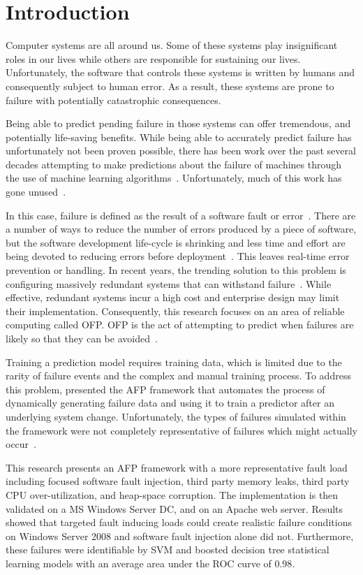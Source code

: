\section{Introduction} \label{chapter1}
Computer systems are all around us.  Some of these systems play insignificant
roles in our lives while others are responsible for sustaining our lives.
Unfortunately, the software that controls these systems is written by humans
and consequently subject to human error.  As a result, these systems are prone
to failure with potentially catastrophic consequences.  

Being able to predict pending failure in those systems can offer tremendous,
and potentially life-saving benefits.  While being able to accurately predict
failure has unfortunately not been proven possible, there has been work over
the past several decades attempting to make predictions about the failure of
machines through the use of machine learning algorithms~\citep{salfnerSurvey}.
Unfortunately, much of this work has gone unused~\citep{irrera2015}.  

In this case, failure is defined as the result of a software fault or
error~\citep{salfnerSurvey}.  There are a number of ways to reduce the number
of errors produced by a piece of software, but the software development
life-cycle is shrinking and less time and effort are being devoted to reducing
errors before deployment~\citep{schmidt2016}.  This leaves real-time error
prevention or handling.  In recent years, the trending solution to this problem
is configuring massively redundant systems that can withstand
failure~\citep{bauer2012}.  While effective, redundant systems incur a high
cost and enterprise design may limit their implementation.  Consequently, this
research focuses on an area of reliable computing called \ac{OFP}.  \ac{OFP} is
the act of attempting to predict when failures are likely so that they can be
avoided~\citep{salfnerSurvey}.  

Training a prediction model requires training data, which is limited due to the
rarity of failure events and the complex and manual training process.  To
address this problem, \citet{irrera2015} presented the \ac{AFP} framework that
automates the process of dynamically generating failure data and using it to
train a predictor after an underlying system change.  Unfortunately, the types
of failures simulated within the framework were not completely representative
of failures which might actually occur~\citep{kikuchi2014}.

This research presents an \ac{AFP} framework with a more representative fault
load including focused software fault injection, third party memory leaks,
third party \ac{CPU} over-utilization, and heap-space corruption.  The
implementation is then validated on a \ac{MS} Windows Server \ac{DC}, and on an
Apache web server.  Results showed that targeted fault inducing loads could
create realistic failure conditions on Windows Server 2008 and software fault
injection alone did not.  Furthermore, these failures were identifiable by
\ac{SVM} and boosted decision tree statistical learning models with an average
area under the \ac{ROC} curve of $0.98$.
